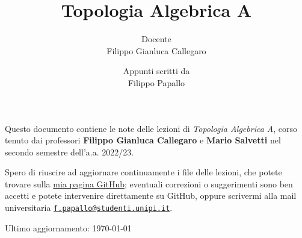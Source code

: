 \documentclass[a4paper, 12pt, oneside, DIV=9, chapterprefix=true, numbers=enddot,bibliography=totoc]{scrbook}
\title{Topologia Algebrica A}
\author{{\normalsize Docente}\\
	Filippo Gianluca Callegaro}
\date{{\normalsize Appunti scritti da}\\
	Filippo Papallo}
\begin{document}
\setlength{\parindent}{0pt}
\setlength{\parskip}{4pt}

\frontmatter
{}
\renewcommand{\thedummy}{\arabic{dummy}}
\maketitle
Questo documento contiene le note delle lezioni di \emph{Topologia Algebrica A},
corso tenuto dai professori \textbf{Filippo Gianluca Callegaro} e
\textbf{Mario Salvetti} nel secondo semestre
dell'a.a. 2022/23. 

Spero di riuscire ad aggiornare continuamente
i file delle lezioni, che potete trovare sulla 
\href{https://github.com/le-pap/Topologia-Algebrica-A}{mia pagina GitHub};
eventuali correzioni o suggerimenti sono ben accetti e potete intervenire direttamente
su GitHub, oppure scrivermi alla mail universitaria 
\href{mailto:f.papallo@studenti.unipi.it}{\texttt{f.papallo@studenti.unipi.it}}.

\hrulefill

Ultimo aggiornamento: \today
	
	
	
\tableofcontents
{}
\setcounter{llecture}{0}
\mainmatter{}
\renewcommand{\thedummy}{\thechapter.\arabic{dummy}}

\renewcommand{\thechapter}{\Roman{chapter}}

	

	

	

	
	
	

	
	
	
	

	

	

	
\end{document}
